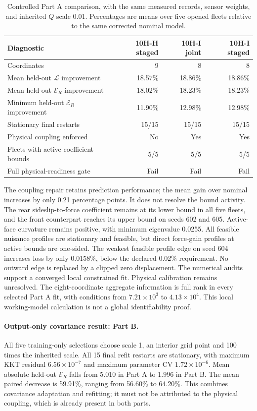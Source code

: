 \begin{table}[htbp]
\centering
\caption{Controlled Part A comparison, with the same measured records,
sensor weights, and inherited $Q$ scale 0.01. Percentages are means over
five opened fleets relative to the same corrected nominal model.}
\label{tab:10hi-structure}
\begin{tabular}{lrrr}
\toprule
Diagnostic & 10H-H staged & 10H-I joint & 10H-I staged\\
\midrule
Coordinates & 9 & 8 & 8\\
Mean held-out $\mathcal L$ improvement & 18.57\% & 18.86\% & 18.86\%\\
Mean held-out $\mathcal E_R$ improvement & 18.02\% & 18.23\% & 18.23\%\\
Minimum held-out $\mathcal E_R$ improvement & 11.90\% & 12.98\% & 12.98\%\\
Stationary final restarts & 15/15 & 15/15 & 15/15\\
Physical coupling enforced & No & Yes & Yes\\
Fleets with active coefficient bounds & 5/5 & 5/5 & 5/5\\
Full physical-readiness gate & Fail & Fail & Fail\\
\bottomrule
\end{tabular}
\end{table}

The coupling repair retains prediction performance; the mean gain over
nominal increases by only 0.21 percentage points. It does not resolve the
bound activity. The rear sideslip-to-force coefficient remains at its lower
bound in all five fleets, and the front counterpart reaches its upper bound
on seeds 602 and 605. Active-face curvature remains positive, with minimum
eigenvalue 0.0255. All feasible nuisance profiles are stationary and feasible,
but direct force-gain profiles at active bounds are one-sided. The weakest
feasible profile edge on seed 604 increases loss by only 0.0158\%, below the
declared 0.02\% requirement. No outward edge is replaced by a clipped zero
displacement. The numerical audits support a converged local constrained fit.
Physical calibration remains unresolved.
The eight-coordinate aggregate information is full rank in every selected
Part A fit, with conditions from $7.21\times10^3$ to $4.13\times10^4$.
This local working-model calculation is not a global identifiability proof.

\paragraph{Output-only covariance result: Part B.}
All five training-only selections choose scale 1, an interior grid point and
100 times the inherited scale. All 15 final refit restarts are stationary,
with maximum KKT residual $6.56\times10^{-7}$ and maximum parameter CV
$1.72\times10^{-6}$. Mean absolute held-out $\mathcal E_R$ falls from 5.010
in Part A to 1.996 in Part B. The mean paired decrease is 59.91\%, ranging
from 56.60\% to 64.20\%. This combines covariance adaptation and refitting;
it must not be attributed to the physical coupling, which is already present
in both parts.

